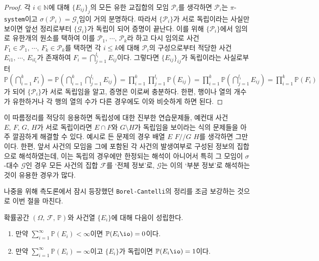 \begin{proof}
    각 $i\in\mathbb{N}$에 대해 $\{E_{ij}\}_j$의 모든 유한 교집합의 모임 $\mathcal{P}_i$를 생각하면 $\mathcal{P}_i$는 $\pi$-\texttt{system}이고 $\sigma(\mathcal{P}_i)=\mathcal{G}_i$임이 거의 분명하다. 따라서 $\{\mathcal{P}_i\}$가 서로 독립이라는 사실만 보이면 앞선 정리로부터 $\{\mathcal{G}_i\}$가 독립이 되어 증명이 끝난다. 이를 위해 $\{\mathcal{P}_i\}$에서 임의로 유한개의 원소를 택하여 이를 $\mathcal{P}_1,\,\cdots,\,\mathcal{P}_k$라 하고 다시 임의로 사건 $F_1\in\mathcal{P}_1,\,\cdots,\,F_k\in\mathcal{P}_k$를 택하면 각 $i\leq k$에 대해 $\mathcal{P}_i$의 구성으로부터 적당한 사건 $E_{i1},\,\cdots,\,E_{il_i}$가 존재하여 $F_i=\bigcap_{j=1}^{l_i}E_{ij}$이다. 그렇다면 $\{E_{ij}\}_{ij}$가 독립이라는 사실로부터 $\mathbb{P}(\bigcap_{i=1}^kF_i)=\mathbb{P}(\bigcap_{i=1}^k\bigcap_{j=1}^{l_i}E_{ij})=\prod_{i=1}^k\prod_{j=1}^{l_i}\mathbb{P}(E_{ij})=\prod_{i=1}^k\mathbb{P}(\bigcap_{j=1}^{l_i}E_{ij})=\prod_{i=1}^k\mathbb{P}(F_i)$가 되어 $\{\mathcal{P}_i\}$가 서로 독립임을 알고, 증명은 이로써 충분하다. 한편, 행이나 열의 개수가 유한하거나 각 행의 열의 수가 다른 경우에도 이와 비슷하게 하면 된다.
\end{proof}

이 따름정리를 적당히 응용하면 독립성에 대한 진부한 연습문제들, 예컨대 사건 $E,\,F,\,G,\,H$가 서로 독립이라면 $E\cap F$와 $G\setminus H$가 독립임을 보이라는 식의 문제들을 아주 깔끔하게 해결할 수 있다. 예시로 든 문제의 경우 배열 $E\,\,F//G\,\,H$를 생각하면 그만이다. 한편, 앞서 사건의 모임을 그에 포함된 각 사건의 발생여부로 구성된 정보의 집합으로 해석하였는데, 이는 독립의 경우에만 한정되는 해석이 아니어서 특히 그 모임이 $\sigma$-대수 $\mathcal{G}$인 경우 모든 사건의 집합 $\mathcal{F}$를 `전체 정보'로, $\mathcal{G}$는 이의 `부분 정보'로 해석하는 것이 유용한 경우가 많다.

나중을 위해 측도론에서 잠시 등장했던 \texttt{Borel-Cantelli}의 정리를 조금 보강하는 것으로 이번 절을 마친다.

\begin{theorem}
    확률공간 $(\Omega,\,\mathcal{F},\,\mathbb{P})$와 사건열 $\{E_i\}$에 대해 다음이 성립한다.
    \begin{enumerate}
        \item 만약 $\sum_{i=1}^\infty\mathbb{P}(E_i)<\infty$이면 $\mathbb{P}(E_i\io)=0$이다.
        \item 만약 $\sum_{i=1}^\infty\mathbb{P}(E_i)=\infty$이고 $\{E_i\}$가 독립이면 $\mathbb{P}(E_i\io)=1$이다.
    \end{enumerate}
\end{theorem}

